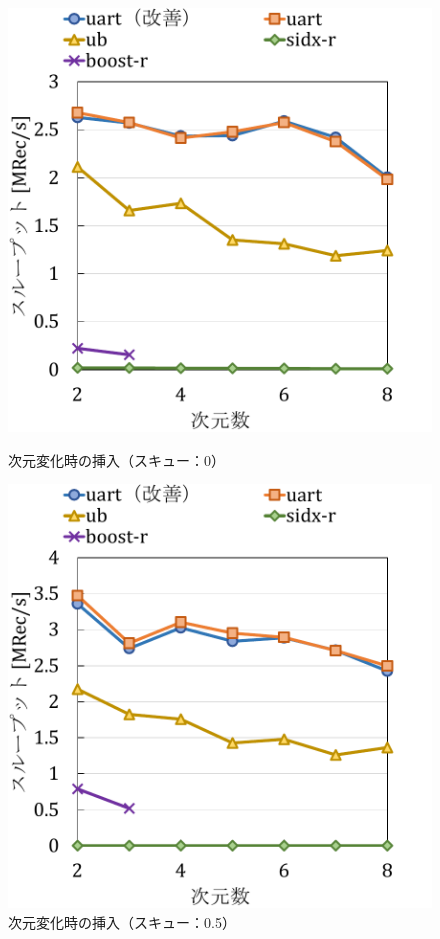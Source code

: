 \begin{figure}
  \begin{minipage}[c]{0.495\textwidth}
    \centering
    \includegraphics[scale=0.45]{./figures/graph-dimention-insert-0.pdf}
    \caption{次元変化時の挿入（スキュー：0）}
    \label{graph:}
  \end{minipage}
  \begin{minipage}[c]{0.495\textwidth}
    \centering
    \includegraphics[scale=0.45]{./figures/graph-dimention-insert-0.5.pdf}
    \caption{次元変化時の挿入（スキュー：0.5）}
    \label{graph:paired}
  \end{minipage}
\end{figure}

